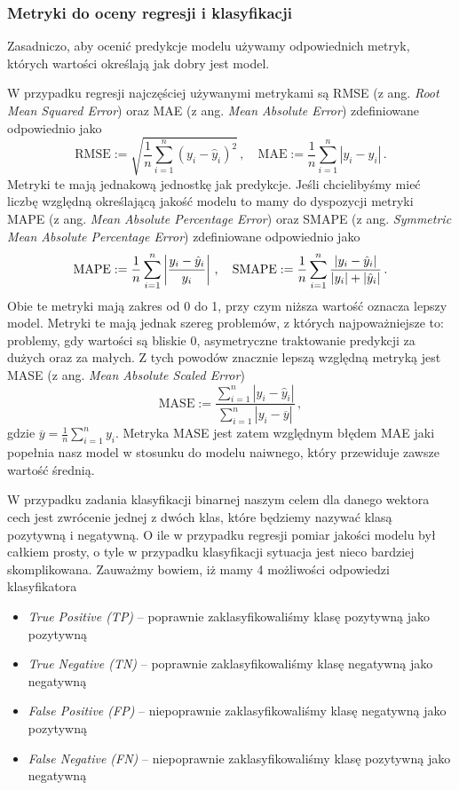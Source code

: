 \documentclass{myclass}
\numberwithin{equation}{subsection}
\begin{document}
\subsubsection{Metryki do oceny regresji i klasyfikacji}

Zasadniczo, aby ocenić predykcje modelu używamy odpowiednich metryk, których wartości określają jak
dobry jest model.

W przypadku regresji najczęściej używanymi metrykami są RMSE (z ang. \textit{Root Mean Squared
Error}) oraz MAE (z ang. \textit{Mean Absolute Error}) zdefiniowane odpowiednio jako
\[
\mathrm{RMSE} := \sqrt{\frac{1}{n}\sum_{i=1}^n (y_i - \hat{y}_i)^2}\,,\quad\mathrm{MAE} := \frac{1}{n}\sum_{i=1}^n|y_i - \hat{y}_i|\,.
\]
Metryki te mają jednakową jednostkę jak predykcje. Jeśli chcielibyśmy mieć liczbę względną
określającą jakość modelu to mamy do dyspozycji metryki MAPE (z ang. \textit{Mean Absolute
Percentage Error}) oraz SMAPE (z ang. \textit{Symmetric Mean Absolute Percentage Error})
zdefiniowane odpowiednio jako
\[
\mathrm{MAPE} := \frac{1}{n}\sum_{i=1}^n\left|\frac{y_i - \hat{y}_i}{y_i}\right|\,,\quad\mathrm{SMAPE} := \frac{1}{n}\sum_{i=1}^n \frac{|y_i - \hat{y}_i|}{|y_i| + |\hat{y}_i|}\,.\\
\]
Obie te metryki mają zakres od 0 do 1, przy czym niższa wartość oznacza lepszy model. Metryki te
mają jednak szereg problemów, z których najpoważniejsze to: problemy, gdy wartości są bliskie 0,
asymetryczne traktowanie predykcji za dużych oraz za małych. Z tych powodów znacznie lepszą względną
metryką jest MASE (z ang. \textit{Mean Absolute Scaled Error})
\[
\mathrm{MASE} := \frac{\sum_{i=1}^n |y_i - \hat{y}_i|}{\sum_{i=1}^n |y_i - \overline{y}|}\,,
\]
gdzie \(\overline{y} = \frac{1}{n}\sum_{i=1}^n y_i\). Metryka MASE jest zatem względnym błędem MAE
jaki popełnia nasz model w stosunku do modelu naiwnego, który przewiduje zawsze wartość średnią.

W przypadku zadania klasyfikacji binarnej naszym celem dla danego wektora cech jest zwrócenie jednej
z dwóch klas, które będziemy nazywać klasą pozytywną i negatywną. O ile w przypadku regresji pomiar
jakości modelu był całkiem prosty, o tyle w przypadku klasyfikacji sytuacja jest nieco bardziej
skomplikowana. Zauważmy bowiem, iż mamy 4 możliwości odpowiedzi klasyfikatora
\begin{itemize}
\item \textit{True Positive (TP)} -- poprawnie zaklasyfikowaliśmy klasę pozytywną jako pozytywną
\item \textit{True Negative (TN)} -- poprawnie zaklasyfikowaliśmy klasę negatywną jako negatywną
\item \textit{False Positive (FP)} -- niepoprawnie zaklasyfikowaliśmy klasę negatywną jako pozytywną
\item \textit{False Negative (FN)} -- niepoprawnie zaklasyfikowaliśmy klasę pozytywną jako negatywną
\end{itemize}
\end{document}
